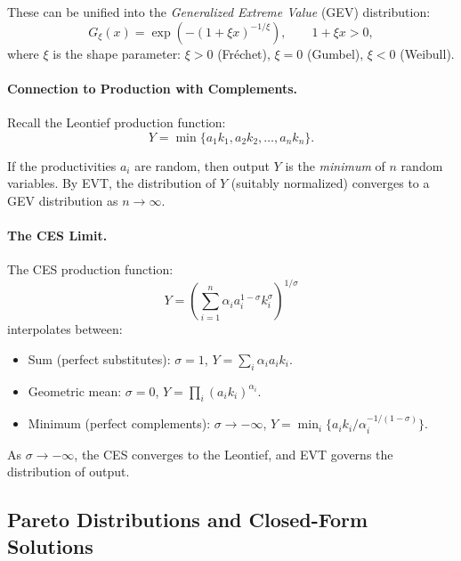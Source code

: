 These can be unified into the \emph{Generalized Extreme Value} (GEV) distribution:
\begin{equation}
G_\xi(x) = \exp\left( -(1 + \xi x)^{-1/\xi} \right), \qquad 1 + \xi x > 0,
\label{eq:ac-adv-gev}
\end{equation}
where $\xi$ is the shape parameter: $\xi > 0$ (Fréchet), $\xi = 0$ (Gumbel), $\xi < 0$ (Weibull).

\paragraph{Connection to Production with Complements.}
Recall the Leontief production function:
\begin{equation}
Y = \min\{a_1 k_1, a_2 k_2, \ldots, a_n k_n\}.
\label{eq:ac-adv-leontief}
\end{equation}

If the productivities $a_i$ are random, then output $Y$ is the \emph{minimum} of $n$ random variables. By EVT, the distribution of $Y$ (suitably normalized) converges to a GEV distribution as $n \to \infty$.

\paragraph{The CES Limit.}
The CES production function:
\begin{equation}
Y = \left( \sum_{i=1}^{n} \alpha_i a_i^{1-\sigma} k_i^{\sigma} \right)^{1/\sigma}
\label{eq:ac-adv-ces-prod}
\end{equation}
interpolates between:
\begin{itemize}[nosep]
\item Sum (perfect substitutes): $\sigma = 1$, $Y = \sum_i \alpha_i a_i k_i$.
\item Geometric mean: $\sigma = 0$, $Y = \prod_i (a_i k_i)^{\alpha_i}$.
\item Minimum (perfect complements): $\sigma \to -\infty$, $Y = \min_i \{a_i k_i / \alpha_i^{-1/(1-\sigma)}\}$.
\end{itemize}

As $\sigma \to -\infty$, the CES converges to the Leontief, and EVT governs the distribution of output.

\subsection{Pareto Distributions and Closed-Form Solutions}
\label{subsec:ac-adv-pareto}

